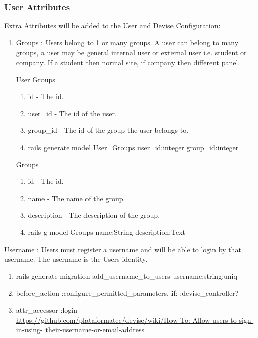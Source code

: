 \documentclass[11pt]{article}
\begin{document}
\subsubsection{User Attributes}
Extra Attributes will be added to the User and Devise Configuration:
\begin{enumerate}

\item Groups : Users belong to 1 or many groups.
	A user can belong to many groups, a user may be general internal user or external user i.e. student or company.
	If a student then normal site, if company then different panel.

	User Groups
	\begin{enumerate}
		\item id - The id.
		\item user\_id - The id of the user.
		\item group\_id - The id of the group the user belongs to.
		\item rails generate model User\_Groups user\_id:integer group\_id:integer
	\end{enumerate}


Groups
\begin{enumerate}
	\item id - The id.
	\item name - The name of the group.
	\item description - The description of the group.
	\item rails g model Groups name:String description:Text
\end{enumerate}

\end{enumerate}

	\item Username : Users must register a username and will be able to login by that username. The 	username is the Users identity.
		\begin{enumerate}
			\item rails generate migration add\_username\_to\_users username:string:uniq
			\item before\_action :configure\_permitted\_parameters, if: :devise\_controller?
			\item attr\_accessor :login
			\hfill \\
			{\url{https://github.com/plataformatec/devise/wiki/How-To:-Allow-users-to-sign-in-using-		their-username-or-email-address}}
		\end{enumerate}
\end{document}
